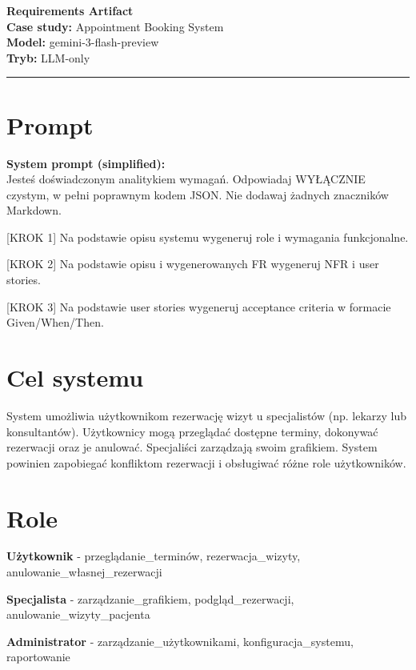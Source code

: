 \documentclass[12pt,a4paper]{article}
\begin{document}
\begin{center}
  {\LARGE\bfseries Requirements Artifact}\\[1.5em]
  {\large \textbf{Case study:} Appointment Booking System}\\[0.3em]
  {\large \textbf{Model:} gemini-3-flash-preview \quad }\\[0.3em]
  {\large \textbf{Tryb:} LLM-only \quad }\\[0.3em]

\end{center}

\vspace{1em}\hrule\vspace{1.5em}

\section{Prompt}

\begin{mdframed}[backgroundcolor=metabg, linewidth=0pt, innerleftmargin=10pt, innerrightmargin=10pt, innertopmargin=8pt, innerbottommargin=8pt]
\textbf{System prompt (simplified):}\\
\small Jesteś doświadczonym analitykiem wymagań. Odpowiadaj WYŁĄCZNIE czystym, w pełni poprawnym kodem JSON. Nie dodawaj żadnych znaczników Markdown.

[KROK 1] 
Na podstawie opisu systemu wygeneruj role i wymagania funkcjonalne.

[KROK 2] 
Na podstawie opisu i wygenerowanych FR wygeneruj NFR i user stories.

[KROK 3] 
Na podstawie user stories wygeneruj acceptance criteria w formacie Given/When/Then.

\end{mdframed}


\section{Cel systemu}
System umożliwia użytkownikom rezerwację wizyt u specjalistów (np. lekarzy lub konsultantów). Użytkownicy mogą przeglądać dostępne terminy, dokonywać rezerwacji oraz je anulować. Specjaliści zarządzają swoim grafikiem. System powinien zapobiegać konfliktom rezerwacji i obsługiwać różne role użytkowników.

\section{Role}
\begin{imtemize}
    \item \textbf{Użytkownik} - przeglądanie\_terminów, rezerwacja\_wizyty, anulowanie\_własnej\_rezerwacji
    \item \textbf{Specjalista} - zarządzanie\_grafikiem, podgląd\_rezerwacji, anulowanie\_wizyty\_pacjenta
    \item \textbf{Administrator} - zarządzanie\_użytkownikami, konfiguracja\_systemu, raportowanie
\end{imtemize}
\end{document}
